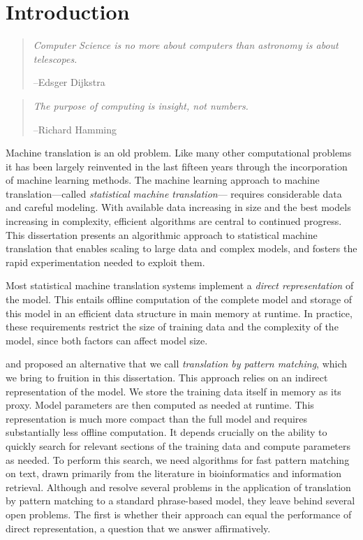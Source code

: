 \chapter{Introduction}\label{chap:introduction}

\begin{quote}
	{\em Computer Science is no more about computers than astronomy is about telescopes.}
	\begin{flushright}
		--Edsger Dijkstra
	\end{flushright}
\end{quote}
\begin{quote}
	{\em The purpose of computing is insight, not numbers.}
	\begin{flushright}
		--Richard Hamming
	\end{flushright}
\end{quote}

Machine translation is an old problem.  Like many other
computational problems it has been largely reinvented in 
the last fifteen years through the incorporation of machine 
learning methods.  The machine learning approach to machine
translation---called {\em statistical machine translation}---
requires considerable data and careful modeling.  
With available data increasing in size
and the best models increasing in complexity,
efficient algorithms are central to continued
progress.  This dissertation presents an algorithmic approach
to statistical machine translation that enables scaling to
large data and complex models, and fosters the rapid experimentation
needed to exploit them.

Most statistical machine translation systems implement a 
{\em direct representation} of the model.  This entails
offline computation of the complete model and storage of
this model in an efficient data structure in main memory 
at runtime.  In practice, these requirements
restrict the size of training data and the complexity
of the model, since both factors can affect model size.

\citet{Callison-Burch:2005:acl} and \citet{Zhang:2005:eamt}
proposed an alternative that we call {\em translation by pattern matching},
which we bring to fruition in this dissertation.  This
approach relies on an indirect representation of the model.
We store the training data itself in memory as its proxy.
Model parameters are then computed as needed at runtime.  This
representation is much more compact than the full model
and requires substantially less offline computation.  
It depends crucially on the ability to quickly search for 
relevant sections of the training data and compute
parameters as needed.   To perform this search, we need
algorithms for fast pattern matching on text, drawn primarily
from the literature in bioinformatics and information
retrieval.  Although
\citet{Callison-Burch:2005:acl} and \citet{Zhang:2005:eamt}
resolve several problems in the application of translation
by pattern matching to a standard phrase-based model, they leave behind several
open problems.  The first is whether their approach
can equal the performance of direct representation, 
a question that we answer affirmatively.

